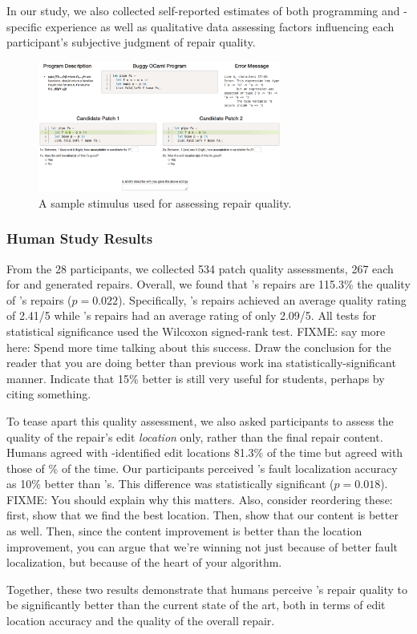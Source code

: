 In our study, we also collected self-reported estimates of both programming and
\ocaml-specific experience as well as qualitative data assessing factors
influencing each participant's subjective judgment of repair quality.

\begin{figure}
  \includegraphics[width=8cm]{SampleStimuli.png}
  \caption{A sample stimulus used for assessing repair quality.}
  \label{fig:stimulus}
\end{figure}

\subsubsection{Human Study Results}
\label{subsubsec:study_res}


From the 28 participants, we collected 534 patch quality assessments, 267 each
for \toolname and \seminal generated repairs. Overall, we found that \toolname's
repairs are 115.3\% the quality of \seminal's repairs ($p=0.022$). Specifically,
\toolname's repairs achieved an average quality rating of 2.41/5 while
\seminal's repairs had an average rating of only 2.09/5. All tests for
statistical significance used the Wilcoxon signed-rank test. FIXME: say
more here: Spend more time talking about this success. Draw the conclusion
for the reader that you are doing better than previous work ina
statistically-significant manner. Indicate that 15\% better is still very
useful for students, perhaps by citing something.

To tease apart this quality assessment, we also asked participants to assess
the quality of the repair's edit \emph{location} only,
rather than the final repair content.
Humans agreed with \toolname-identified edit locations 81.3\%
of the time but agreed with those of \% of the time.
Our participants perceived \toolname's fault localization accuracy
as 10\% better than \seminal's. This difference was statistically significant
($p=0.018$). FIXME: You should explain why this matters. Also, consider
reordering these: first, show that we find the best location. Then, show
that our content is better as well. Then, since the content improvement is
better than the location improvement, you can argue that we're winning not
just because of better fault localization, but because of the heart of your
algorithm.


Together, these two results demonstrate that humans perceive \toolname's repair
quality to be significantly better than the current state of the art, both in
terms of edit location accuracy and the quality of the overall repair.
